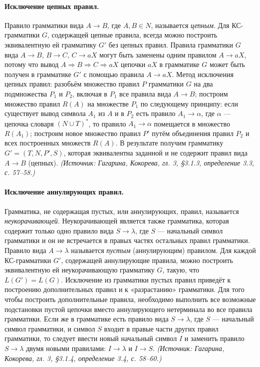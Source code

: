 \documentclass[a4paper,12pt]{article}
\begin{document}
\paragraph{Исключение цепных правил.}
Правило грамматики вида \(A\to B\), где \(A,B\in N\), называется \emph{цепным}. Для КС-грамматики \(G\), содержащей цепные правила, всегда можно построить эквивалентную ей грамматику \(G'\) без цепных правил. Правила грамматики \(G\) вида \(A\to B\), \(B\to C\), \(C\to aX\) могут быть заменены одним правилом \(A\to aX\), потому что вывод \(A\Rightarrow B\Rightarrow C\Rightarrow aX\) цепочки \(aX\) в грамматике \(G\) может быть получен в грамматике \(G'\) с помощью правила \(A\to aX\). Метод исключения цепных правил: разобьём множество правил \(P\) грамматики \(G\) на два подмножества \(P_1\) и \(P_2\), включая в \(P_1\) все правила вида \(A\to B\); построим множество правил \(R(A)\) на множестве \(P_1\) по следующему принципу: если существует вывод символа \(A_1\) из \(A\) и в \(P_2\) есть правило \(A_1\to\alpha\), где \(\alpha\) — цепочка словаря \((N\cup T)^*\), то правило \(A_1\to\alpha\) помещается в множество \(R(A_1)\); построим новое множество правил \(P'\) путём объединения правил \(P_2\) и всех построенных множеств \(R(A)\). В результате получим грамматику \(G'=(T,N,P',S)\), которая эквивалентна заданной и не содержит правил вида \(A\to B\) (цепных).
\textit{(Источник: Гагарина, Кокорева, гл. 3, §3.1.3, определение 3.3, с. 57--58.)}

\paragraph{Исключение аннулирующих правил.}
Грамматика, не содержащая пустых, или аннулирующих, правил, называется \emph{неукорачивающей}. Неукорачивающей является также грамматика, которая содержит только одно правило вида \(S\to\lambda\), где \(S\) — начальный символ грамматики и он не встречается в правых частях остальных правил грамматики. Правило вида \(A\to\lambda\) называется \emph{пустым} (аннулирующим) правилом. Для каждой КС-грамматики \(G'\), содержащей аннулирующие правила, можно построить эквивалентную ей неукорачивающую грамматику \(G\), такую, что \(L(G')=L(G)\). Исключение из грамматики пустых правил приведёт к построению дополнительных правил и к «разрастанию» грамматики. Для того чтобы построить дополнительные правила, необходимо выполнить все возможные подстановки пустой цепочки вместо аннулирующего нетерминала во все правила грамматики. Если же в грамматике есть правило вида \(S\to\lambda\), где \(S\) — начальный символ грамматики, и символ \(S\) входит в правые части других правил грамматики, то следует ввести новый начальный символ \(I\) и заменить правило \(S\to\lambda\) двумя новыми правилами: \(I\to\lambda\) и \(I\to S\).
\textit{(Источник: Гагарина, Кокорева, гл. 3, §3.1.4, определение 3.4, с. 58--60.)}
\end{document}
